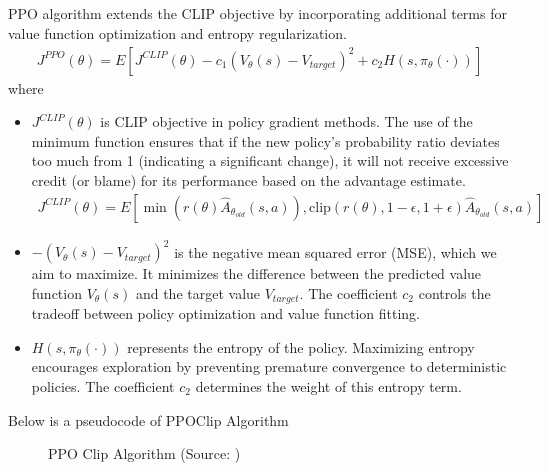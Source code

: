 \documentclass[letterpaper,11pt,english]{sphinxmanual}
\begin{document}
\subsection{}
\label{\detokenize{rlhf:ppo-objective-function}}
\sphinxAtStartPar
PPO algorithm extends the CLIP objective by incorporating additional
terms for value function optimization and entropy regularization.
\begin{equation*}
\begin{split}J^{PPO}(\theta) = E[J^{CLIP}(\theta) - c_1(V_\theta(s)-V_{target})^2 + c_2 H(s,\pi_\theta(\cdot))]\end{split}
\end{equation*}
\sphinxAtStartPar
where
\begin{itemize}
\item {} 
\sphinxAtStartPar
\(J^{CLIP}(\theta)\) is CLIP objective in policy gradient methods.
The use of the minimum function ensures that if the new policy’s
probability ratio deviates too much from 1 (indicating a significant
change), it will not receive excessive credit (or blame) for its
performance based on the advantage estimate.
\begin{equation*}
\begin{split}J^{CLIP}(\theta) = E[\min(r(\theta)\hat{A}_{\theta_{old}}(s,a)), \text{clip}(r(\theta),1-\epsilon, 1+\epsilon) \hat{A}_{\theta_{old}}(s,a)]\end{split}
\end{equation*}
\item {} 
\sphinxAtStartPar
\(-(V_\theta(s) - V_{target})^2\) is the negative mean squared
error (MSE), which we aim to maximize. It minimizes the difference
between the predicted value function \(V_\theta(s)\) and the
target value \(V_{target}\). The coefficient \(c_2\) controls
the tradeoff between policy optimization and value function fitting.

\item {} 
\sphinxAtStartPar
\(H(s,\pi_\theta(\cdot))\) represents the entropy of the policy.
Maximizing entropy encourages exploration by preventing premature
convergence to deterministic policies. The coefficient \(c_2\)
determines the weight of this entropy term.

\end{itemize}

\sphinxAtStartPar
Below is a pseudocode of PPO\sphinxhyphen{}Clip Algorithm

\begin{figure}[htbp]
\centering
\capstart

\noindent{}
\caption{PPO Clip Algorithm (Source: )}\label{\detokenize{rlhf:id7}}\end{figure}
\end{document}
